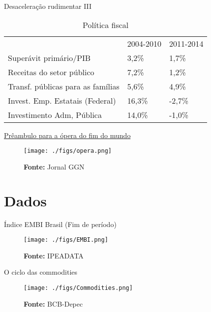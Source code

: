 \documentclass[presentation]{beamer}
\begin{document}
\begin{frame}[label={sec:orgd84bf93}]{Desaceleração rudimentar III}
\begin{table}[htbp]
\caption{Política fiscal}
\centering
\begin{tabular}{lll}
\hline
 & 2004-2010 & 2011-2014\\
Superávit primário/PIB & 3,2\% & 1,7\%\\
Receitas do setor público & 7,2\% & 1,2\%\\
Transf. públicas para as famílias & 5,6\% & 4,9\%\\
Invest. Emp. Estatais (Federal) & 16,3\% & -2,7\%\\
Investimento Adm, Pública & 14,0\% & -1,0\%\\
\hline
\end{tabular}
\end{table}
\end{frame}


\begin{frame}[label={sec:orgb59e100}]{\href{https://www.causaoperaria.org.br/brasil-o-golpe-a-opera-do-fim-do-mundo-artista-retrata-o-golpe-de-estado-no-pais/}{Prêambulo para a ópera do fim do mundo}}
\begin{figure}[htb]
\centering
\caption{Brasil, O Golpe: A Ópera do fim do mundo} 
\texttt{[image: ./figs/opera.png]}
\caption*{\textbf{Fonte:} Jornal GGN}
\end{figure}
\end{frame}


\section{Dados}
\label{sec:orgc1dfd65}

\begin{frame}[label={sec:org1fb6207}]{Índice EMBI Brasil (Fim de período)}
\begin{figure}[htb]
\centering
\caption{Spread Soberano = EMBI+} 
\texttt{[image: ./figs/EMBI.png]}
\label{fig:embi}
\caption*{\textbf{Fonte:} IPEADATA}
\end{figure}
\end{frame}

\begin{frame}[label={sec:orgb0e6406}]{O ciclo das commodities}
\begin{figure}[htb]
\centering
\caption{Índice de Commodities - Brasil\\Média móvel 12 meses} 
\texttt{[image: ./figs/Commodities.png]}
\caption*{\textbf{Fonte:} BCB-Depec}
\end{figure}
\end{frame}
\end{document}

